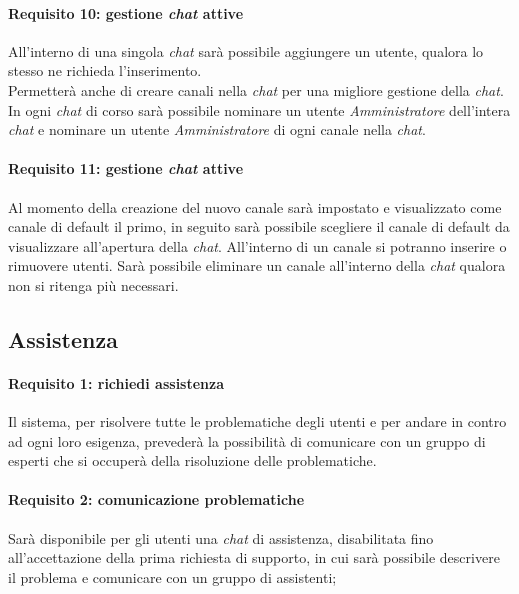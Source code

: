 \paragraph{Requisito 10: gestione \emph{chat} attive\\}
All’interno di una singola \emph{chat} sarà possibile aggiungere un utente, qualora lo stesso ne richieda l’inserimento.\\
Permetterà anche di creare canali nella \emph{chat} per una migliore gestione della \emph{chat}. 
In ogni \emph{chat} di corso sarà possibile nominare un utente \emph{Amministratore} dell’intera \emph{chat} e nominare un utente \emph{Amministratore} di ogni canale nella \emph{chat}.

\paragraph{Requisito 11: gestione \emph{chat} attive\\}
Al momento della creazione del nuovo canale sarà impostato e visualizzato come canale di default il primo, in seguito sarà possibile scegliere il canale di default da visualizzare all’apertura della \emph{chat}. All’interno di un canale si potranno inserire o rimuovere utenti. Sarà possibile eliminare un canale all’interno della \emph{chat} qualora non si ritenga più necessari.

\subsection {Assistenza}

\paragraph{Requisito 1: richiedi assistenza\\}
Il sistema, per risolvere tutte le problematiche degli utenti e per andare in contro ad ogni loro esigenza, prevederà la possibilità di comunicare con un gruppo di esperti che si occuperà della risoluzione delle problematiche.

\paragraph{Requisito 2: comunicazione problematiche\\}
Sarà disponibile per gli utenti una \emph{chat} di assistenza, disabilitata fino all’accettazione della prima richiesta di supporto, in cui sarà possibile descrivere il problema e comunicare con un gruppo di assistenti;

